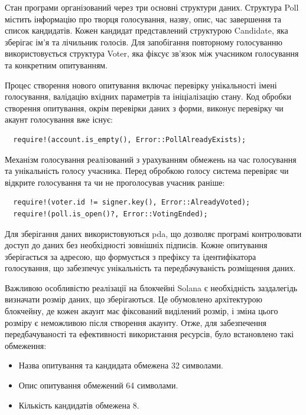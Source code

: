 \documentclass[14pt]{extreport}
\newcounter{req}[subsubsection]
\begin{document}
  Стан програми організований через три основні структури даних. Структура Poll містить інформацію про творця голосування, назву, опис, час завершення та список кандидатів. Кожен кандидат представлений структурою Candidate, яка зберігає ім'я та лічильник голосів. Для запобігання повторному голосуванню використовується структура Voter, яка фіксує зв'язок між учасником голосування та конкретним опитуванням.
  
  Процес створення нового опитування включає перевірку унікальності імені голосування, валідацію вхідних параметрів та ініціалізацію стану. Код обробки створення опитування, окрім перевірки даних з форми, виконує перевірку чи акаунт голосування вже існує:
  
  {
  \begin{lstlisting}
  require!(account.is_empty(), Error::PollAlreadyExists);\end{lstlisting}}
  
  Механізм голосування реалізований з урахуванням обмежень на час голосування та унікальність голосу учасника. Перед обробкою голосу система перевіряє чи відкрите голосування та чи не проголосував учасник раніше:
  
  {
  \begin{lstlisting}
  require!(voter.id != signer.key(), Error::AlreadyVoted);
  require!(poll.is_open()?, Error::VotingEnded);\end{lstlisting}}
  
  Для зберігання даних використовуються \gls{pda}, що дозволяє програмі контролювати доступ до даних без необхідності зовнішніх підписів. Кожне опитування зберігається за адресою, що формується з префіксу та ідентифікатора голосування, що забезпечує унікальність та передбачуваність розміщення даних.

  Важливою особливістю реалізації на блокчейні Solana є необхідність заздалегідь визначати розмір даних, що зберігаються. Це обумовлено архітектурою блокчейну, де кожен акаунт має фіксований виділений розмір, і зміна цього розміру є неможливою після створення акаунту. Отже, для забезпечення передбачуваності та ефективності використання ресурсів, було встановлено такі обмеження:

  \begin{itemize}
    \item Назва опитування та кандидата обмежена 32 символами.
    \item Опис опитування обмежений 64 символами. 
    \item Кількість кандидатів обмежена 8.
  \end{itemize}
\end{document}
